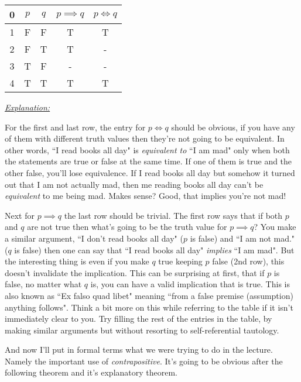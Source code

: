 \documentclass{article}
\begin{document}
\begin{center}
	\begin{tabular}{c||c|c||c|c}
		0 & $p$ & $q$ & $p \implies q$ & $p \iff q$ \\
		\hline
		1 & F & F & T & T\\
		2 & F & T & T & - \\
		3 & T & F & - & - \\
		4 & T & T & T & T \\
	\end{tabular}
\end{center}

\textit{\underline{Explanation:}}

\vspace{2.5mm}

For the first and last row, the entry for $p \iff q $ should be obvious, if you have any of them with different truth values then they're not going to be equivalent. In other words, ``I read books all day" is \textit{equivalent to} ``I am mad" only when both the statements are true or false at the same time. If one of them is true and the other false, you'll lose equivalence. If I read books all day but somehow it turned out that I am not actually mad, then me reading books all day can't be \textit{equivalent} to me being mad. Makes sense? Good, that implies you're not mad!

Next for $p \implies q$ the last row should be trivial. The first row says that if both $p$ and $q$ are not true then what's going to be the truth value for $p \implies q$? You make a similar argument, ``I don't read books all day" ($p$ is false) and ``I am not mad." ($q$ is false) then one can say that ``I read books all day" \textit{implies} ``I am mad". But the interesting thing is even if you make $q$ true keeping $p$ false (2nd row), this doesn't invalidate the implication. This can be surprising at first, that if $p$ is false, no matter what $q$ is, you can have a valid implication that is true. This is also known as ``Ex falso quad libet" meaning ``from a false premise (assumption) anything follows". Think a bit more on this while referring to the table if it isn't immediately clear to you. Try filling the rest of the entries in the table, by making similar arguments but without resorting to self-referential tautology.   

And now I'll put in formal terms what we were trying to do in the lecture. Namely the important use of \textit{contrapositive}. It's going to be obvious after the following theorem and it's explanatory theorem.
\end{document}
